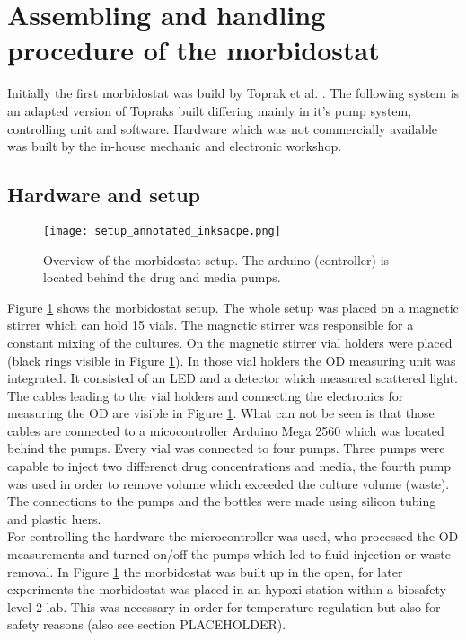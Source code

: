 \newpage



\section{Assembling and handling procedure of the morbidostat}
Initially the first morbidostat was build by Toprak et al. \cite{morb_toprak}. The following system is an adapted version of Topraks built differing mainly in it's pump system, controlling unit and software. Hardware which was not commercially available was built by the in-house mechanic and electronic workshop.

\subsection{Hardware and setup}

\begin{figure}[H]
	\texttt{[image: setup\_annotated\_inksacpe.png]}
	\caption{Overview of the morbidostat setup. The arduino (controller) is located behind the drug and media pumps.}
	\label{figure:morbidostat_setup}
\end{figure}  
Figure \ref{figure:morbidostat_setup} shows the morbidostat setup.
The whole setup was placed on a magnetic stirrer which can hold 15 vials. The magnetic stirrer was responsible for a constant mixing of the cultures. On the magnetic stirrer vial holders were placed (black rings visible in Figure \ref{figure:morbidostat_setup}). In those vial holders the OD measuring unit was integrated. It consisted of an LED and a detector which measured scattered light. The cables leading to the vial holders and  connecting the electronics for measuring the OD are visible in Figure \ref{figure:morbidostat_setup}. What can not be seen is that those cables are connected to a micocontroller Arduino Mega 2560 which was located behind the pumps. Every vial was connected to four pumps. Three pumps were capable to inject two differenct drug concentrations and media, the fourth pump was used in order to remove volume which exceeded the culture volume (waste). The connections to the pumps and the bottles were made using silicon tubing and plastic luers. \\
For controlling the hardware  the microcontroller was used, who processed the OD measurements and turned on/off the pumps which led to fluid injection or waste removal.
In Figure \ref{figure:morbidostat_setup} the morbidostat was built up in the open, for later experiments the morbidostat was placed in an hypoxi-station within a biosafety level 2 lab. This was necessary in order for temperature regulation but also for safety reasons (also see section PLACEHOLDER).  


